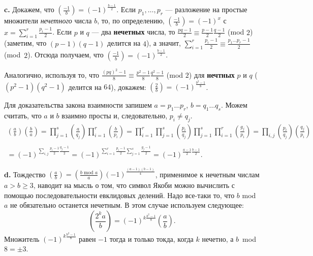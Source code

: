 \documentclass{mai_book}
\begin{document}
\textbf{c. } Докажем, что $(\frac{-1}{b}) = (-1)^{\frac{b-1}{2}}$. Если $p_1,\ldots ,p_r$ --- разложение на простые множители \textit{нечетного} числа $b$, то, по определению, $(\frac{-1}{b}) = (-1)^x$ с $x = \sum_{i = 1}^r \frac{p_i - 1}{2}$. Если $p$ и $q$ --- два \textbf{нечетных} числа, то $\frac{pq - 1}{2} \equiv \frac{p-1}{2} \frac{q-1}{2}$ (mod $2$) (заметим, что $(p-1)(q-1)$ делится на $4$), а значит, $\sum_{i = 1}^r \frac{p_i - 1} {2} \equiv \frac{p_1\ldots p_r - 1}{2}$ (mod~$2$). Отсюда получаем, что $(\frac{-1}{b}) = (-1)^{\frac{b-1}{2}}$. \par
Аналогично, используя то, что $\frac{(pq)^2-1}{8} \equiv \frac{p^2-1}{8} \frac{q^2-1}{8}$ (mod $2$) для \textbf{нечтных} $p$ и $q$ ($(p^2-1)(q^2-1)$ делится на $64$), докажем: $(\frac{2}{b}) = (-1)^{\frac{b^2-1}{8}}$. \par
Для доказательства закона взаимности запишем $a = p_1\ldots p_r$, $b = q_1\ldots q_s$. Можем считать, что $a$ и $b$ взаимно просты и, следовательно, $p_i \neq q_j$.
\begin{gather*}
	\left( \frac{a}{b} \right) \left( \frac{b}{a} \right) = \prod\limits_{j = 1}^s \left( \frac{a}{q_j} \right) \prod\limits_{i = 1}^r \left( \frac{b}{p_i} \right) = \prod\limits_{i = 1}^r \prod\limits_{j = 1}^s \left( \frac{p_i}{q_j} \right) \prod\limits_{j = 1}^s \prod\limits_{i = 1}^r \left( \frac{g_j}{p_i} \right) = \prod\limits_{i,j} \left( \frac{p_i}{q_j} \right) \left( \frac{q_j}{p_i} \right) \\
	\\
	=(-1)^{\sum\limits_{i,j} \frac{p_i - 1}{2} \frac{q_j - 1}{2}} = (-1)^{\sum\limits_{i = 1}^r \frac{p_i - 1}{2} \sum\limits_{j = 1}^s \frac{g_j -1}{2}} = (-1)^{\frac{a-1}{2} \frac{b-1}{2}}.
\end{gather*}

\textbf{d. } Тождество $(\frac{a}{b}) = (\frac{b \text{ mod } a}{a})(-1)^{\frac{(a-1)(b-1)}{4}}$, применимое к нечетным числам $a > b \ge 3$, наводит на мысль о том, что символ Якоби можно вычислить с помощью последовательности евклидовых делений. Надо все-таки то, что $b$ mod $a$ не обязательно останется нечетным. В этом случае используем следующее:
\begin{equation*}
	\left( \frac{2^k a}{b} \right) = (-1)^{k \frac{b^2 -1}{8}} \left( \frac{a}{b} \right).
\end{equation*}
Множитель $(-1)^{k \frac{b^2 -1}{8}}$ равен $-1$ тогда и только токда, когда $k$ нечетно, а $b$~mod~$8 = \pm 3$.
\end{document}
